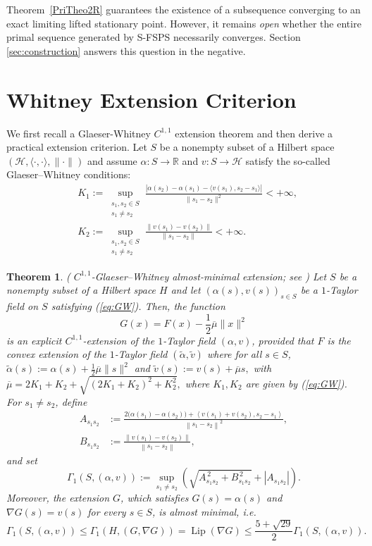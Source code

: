 \documentclass[11pt]{article}
\numberwithin{equation}{section}
\newtheorem{theorem}{Theorem}[section]
\newcommand{\Hsp}{\mathcal H}
\newcommand{\ip}[2]{\left\langle #1,#2\right\rangle}
\newcommand{\norm}[1]{\left\lVert #1\right\rVert}
\newcommand{\Lip}{\operatorname{Lip}}
\begin{document}
\medskip
\noindent
Theorem~\ref{PriTheo2R} guarantees the existence of a subsequence converging to an exact limiting lifted stationary point. However, it remains {\it open} whether the entire primal sequence generated by S-FSPS necessarily converges.
Section \ref{sec:construction} answers this question in the negative.


\section{Whitney Extension Criterion}\label{sec:whitney}
We first recall a Glaeser-Whitney \(C^{1,1}\) extension theorem \cite{DaniilidisEtAl2018} and then derive a practical extension criterion.
Let $S$ be a nonempty subset of a Hilbert space
$(\mathcal H,\langle\cdot,\cdot\rangle,\|\cdot\|)$ and assume
$\alpha:S\rightarrow \mathbb{R}$ and $v:S\rightarrow \mathcal H$ satisfy
the so-called Glaeser--Whitney conditions:
\begin{equation}\label{eq:GW}
\begin{aligned}
&K_1:=\sup_{\substack{s_1,s_2\in S\\s_1\neq s_2}}
\frac{\left|
\alpha(s_2)-\alpha(s_1)
-\langle v(s_1),s_2-s_1\rangle
\right|}
{\|s_1-s_2\|^2}
<+\infty,\\[2ex]
&K_2:=\sup_{\substack{s_1,s_2\in S\\s_1\neq s_2}}
\frac{\|v(s_1)-v(s_2)\|}
{\|s_1-s_2\|}
<+\infty .
\end{aligned}
\end{equation}
\begin{theorem}\label{lem:whitney}(
  \(C^{1,1}\)-Glaeser--Whitney almost-minimal extension;
  see \cite[Theorem~3.1]{DaniilidisEtAl2018}
)
Let $S$ be a nonempty subset of a Hilbert space $H$ and let
$(\alpha(s),v(s))_{s\in S}$ be a $1$-Taylor field on $S$ satisfying
(\ref{eq:GW}). Then, the function
\[
G(x)=F(x)-\frac{1}{2}\overline{\mu}\|x\|^2
\]
is an explicit $C^{1,1}$-extension of the $1$-Taylor field $(\alpha,v)$,
provided that $F$ is the convex extension of the $1$-Taylor field
$(\tilde{\alpha},\tilde v)$ where for all $s\in S$,
$
\tilde{\alpha}(s):=\alpha(s)+\frac{1}{2}\overline{\mu}\|s\|^2
$
and
$
\tilde v(s):=v(s)+\overline{\mu}s,
$
with
$
\overline{\mu}
=
2K_1+K_2+
\sqrt{(2K_1+K_2)^2+K_2^2},
$
where $K_1,K_2$ are given by (\ref{eq:GW}).
For \(s_1\ne s_2\), define
\begin{align}
A_{s_1s_2}
&:=
\frac{
2\bigl(\alpha(s_1)-\alpha(s_2)\bigr)
+\ip{v(s_1)+v(s_2)}{s_2-s_1}}
{\norm{s_1-s_2}^{2}},\label{Afor}\\
B_{s_1s_2}
&:=
\frac{\norm{v(s_1)-v(s_2)}}{\norm{s_1-s_2}},\label{Bfor}
\end{align}
and set
\[
\Gamma_1(S,(\alpha,v))
:=
\sup_{s_1\ne s_2}
\left(
\sqrt{A_{s_1s_2}^{\,2}+B_{s_1s_2}^{\,2}}
+|A_{s_1s_2}|
\right).
\]
Moreover, the extension $G$, which satisfies
$G(s)=\alpha(s)$ and $\nabla G(s)=v(s)$ for every $s\in S$,
 is almost minimal, i.e.
\[
\Gamma_1(S,(\alpha,v))
\leq
\Gamma_1(H,(G,\nabla G))
=
\operatorname{Lip}(\nabla G)
\leq
\frac{5+\sqrt{29}}{2}
\Gamma_1(S,(\alpha,v)).
\]
\end{theorem}
\end{document}

